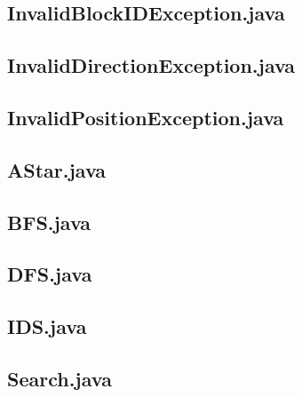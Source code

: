 \documentclass[a4paper]{article}
\begin{document}
\begin{appendices}
  \newpage
  \subsection{InvalidBlockIDException.java}
  \label{app:code-InvalidBlockIDException}
  

    \subsection{InvalidDirectionException.java}
  \label{app:code-InvalidDirectionException}
  

  \subsection{InvalidPositionException.java}
  \label{app:code-InvalidPositionException}
  

  \newpage
  \subsection{AStar.java}
  \label{app:code-AStar}
  

  \newpage
  \subsection{BFS.java}
  \label{app:code-BFS}
  

  \newpage
  \subsection{DFS.java}
  \label{app:code-DFS}
  

  \newpage
  \subsection{IDS.java}
  \label{app:code-IDS}
  

  \newpage
  \subsection{Search.java}
  \label{app:code-Search}
  


\end{appendices}
\end{document}
